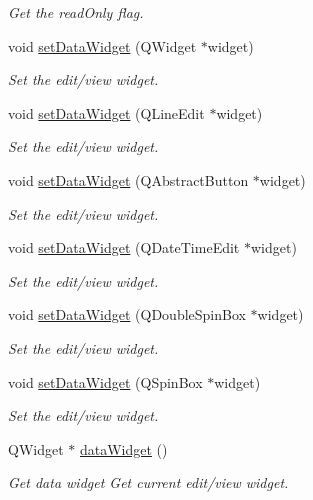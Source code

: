 \begin{DoxyCompactItemize}
\begin{DoxyCompactList}\small\item\em Get the readOnly flag. \end{DoxyCompactList}\item 
void \hyperlink{classmdt_sql_field_handler_ad337249c9e123d31c53ed199384825d0}{setDataWidget} (QWidget $\ast$widget)
\begin{DoxyCompactList}\small\item\em Set the edit/view widget. \end{DoxyCompactList}\item 
void \hyperlink{classmdt_sql_field_handler_ac326e3d22f67b1c6f76bb859e01dc486}{setDataWidget} (QLineEdit $\ast$widget)
\begin{DoxyCompactList}\small\item\em Set the edit/view widget. \end{DoxyCompactList}\item 
void \hyperlink{classmdt_sql_field_handler_aa9a60be66471371ff52eb2a95989feba}{setDataWidget} (QAbstractButton $\ast$widget)
\begin{DoxyCompactList}\small\item\em Set the edit/view widget. \end{DoxyCompactList}\item 
void \hyperlink{classmdt_sql_field_handler_abb528a4e0245d12308870556eefc934a}{setDataWidget} (QDateTimeEdit $\ast$widget)
\begin{DoxyCompactList}\small\item\em Set the edit/view widget. \end{DoxyCompactList}\item 
void \hyperlink{classmdt_sql_field_handler_a080380d84da12132783a8de9ad9fdf4c}{setDataWidget} (QDoubleSpinBox $\ast$widget)
\begin{DoxyCompactList}\small\item\em Set the edit/view widget. \end{DoxyCompactList}\item 
void \hyperlink{classmdt_sql_field_handler_a13a1e634bdb0d5c85ab1198aa09a64e2}{setDataWidget} (QSpinBox $\ast$widget)
\begin{DoxyCompactList}\small\item\em Set the edit/view widget. \end{DoxyCompactList}\item 
QWidget $\ast$ \hyperlink{classmdt_sql_field_handler_a91ab8160d5015b6030e7169ab7108d33}{dataWidget} ()
\begin{DoxyCompactList}\small\item\em Get data widget Get current edit/view widget. \end{DoxyCompactList}\item 

\end{DoxyCompactItemize}
